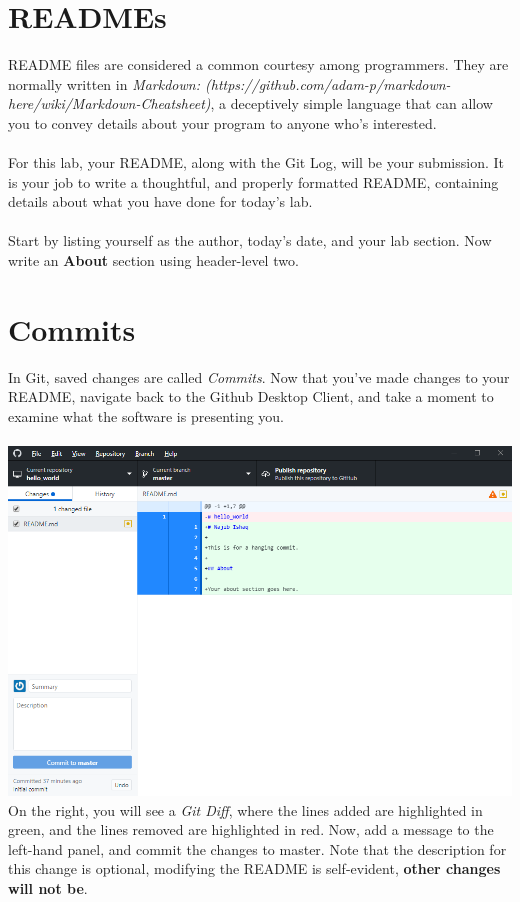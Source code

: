 \documentclass[12pt, letter]{article}
\begin{document}
    \section{READMEs}
    README files are considered a common courtesy among programmers. They are normally written in \emph{Markdown: (https://github.com/adam-p/markdown-here/wiki/Markdown-Cheatsheet)}, a deceptively simple language that can allow you to convey details about your program to anyone who's interested. 
    \\ \\
    For this lab, your README, along with the Git Log, will be your submission. It is your job to write a thoughtful, and properly formatted README, containing details about what you have done for today's lab.
    \\ \\ 
    Start by listing yourself as the author, today's date, and your lab section. Now write an \textbf{About} section using header-level two. 

    \section{Commits}
    In Git, saved changes are called \emph{Commits}. Now that you've made changes to your README, navigate back to the Github Desktop Client, and take a moment to examine what the software is presenting you. \\ \\ %
    \includegraphics{screenshots/shot4.bmp}
    \\
    On the right, you will see a \emph{Git Diff}, where the lines added are highlighted in green, and the lines removed are highlighted in red. Now, add a message to the left-hand panel, and commit the changes to master. Note that the description for this change is optional, modifying the README is self-evident, \textbf{other changes will not be}.
\end{document}
